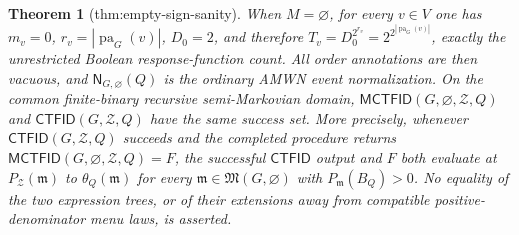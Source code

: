 \documentclass{article}
\newtheorem{theorem}{Theorem}
\begin{document}
\begin{theorem}[thm:empty-sign-sanity]\label{thm:empty-sign-sanity}
When \(M=\varnothing\), for every \(v\in V\) one has \(m_v=0\), \(r_v=|\operatorname{pa}_G(v)|\), \(D_0=2\), and therefore \(T_v=D_0^{2^{r_v}}=2^{2^{|\operatorname{pa}_G(v)|}}\), exactly the unrestricted Boolean response-function count. All order annotations are then vacuous, and \(\mathsf N_{G,\varnothing}(Q)\) is the ordinary AMWN event normalization. On the common finite-binary recursive semi-Markovian domain, \(\mathsf{MCTFID}(G,\varnothing,\mathcal Z,Q)\) and \(\mathsf{CTFID}(G,\mathcal Z,Q)\) have the same success set. More precisely, whenever \(\mathsf{CTFID}(G,\mathcal Z,Q)\) succeeds and the completed procedure returns \(\mathsf{MCTFID}(G,\varnothing,\mathcal Z,Q)=F\), the successful \(\mathsf{CTFID}\) output and \(F\) both evaluate at \(P_{\mathcal Z}(\mathfrak m)\) to \(\theta_Q(\mathfrak m)\) for every \(\mathfrak m\in\mathfrak M(G,\varnothing)\) with \(P_{\mathfrak m}(B_Q)>0\). No equality of the two expression trees, or of their extensions away from compatible positive-denominator menu laws, is asserted.
\end{theorem}
\end{document}
